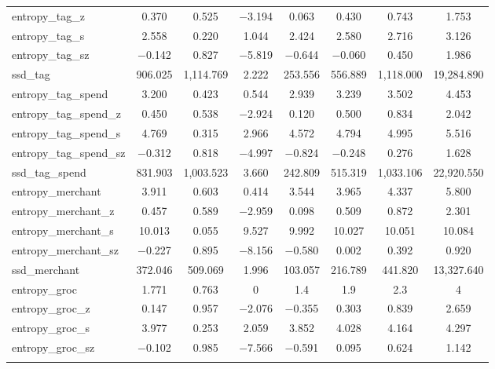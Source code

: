 \begin{table}[!htbp]
\begin{tabular}{@{\extracolsep{5pt}}lccccccc}
entropy\_tag\_z & 0.370 & 0.525 & $-$3.194 & 0.063 & 0.430 & 0.743 & 1.753 \\ 
entropy\_tag\_s & 2.558 & 0.220 & 1.044 & 2.424 & 2.580 & 2.716 & 3.126 \\ 
entropy\_tag\_sz & $-$0.142 & 0.827 & $-$5.819 & $-$0.644 & $-$0.060 & 0.450 & 1.986 \\ 
ssd\_tag & 906.025 & 1,114.769 & 2.222 & 253.556 & 556.889 & 1,118.000 & 19,284.890 \\ 
entropy\_tag\_spend & 3.200 & 0.423 & 0.544 & 2.939 & 3.239 & 3.502 & 4.453 \\ 
entropy\_tag\_spend\_z & 0.450 & 0.538 & $-$2.924 & 0.120 & 0.500 & 0.834 & 2.042 \\ 
entropy\_tag\_spend\_s & 4.769 & 0.315 & 2.966 & 4.572 & 4.794 & 4.995 & 5.516 \\ 
entropy\_tag\_spend\_sz & $-$0.312 & 0.818 & $-$4.997 & $-$0.824 & $-$0.248 & 0.276 & 1.628 \\ 
ssd\_tag\_spend & 831.903 & 1,003.523 & 3.660 & 242.809 & 515.319 & 1,033.106 & 22,920.550 \\ 
entropy\_merchant & 3.911 & 0.603 & 0.414 & 3.544 & 3.965 & 4.337 & 5.800 \\ 
entropy\_merchant\_z & 0.457 & 0.589 & $-$2.959 & 0.098 & 0.509 & 0.872 & 2.301 \\ 
entropy\_merchant\_s & 10.013 & 0.055 & 9.527 & 9.992 & 10.027 & 10.051 & 10.084 \\ 
entropy\_merchant\_sz & $-$0.227 & 0.895 & $-$8.156 & $-$0.580 & 0.002 & 0.392 & 0.920 \\ 
ssd\_merchant & 372.046 & 509.069 & 1.996 & 103.057 & 216.789 & 441.820 & 13,327.640 \\ 
entropy\_groc & 1.771 & 0.763 & 0 & 1.4 & 1.9 & 2.3 & 4 \\ 
entropy\_groc\_z & 0.147 & 0.957 & $-$2.076 & $-$0.355 & 0.303 & 0.839 & 2.659 \\ 
entropy\_groc\_s & 3.977 & 0.253 & 2.059 & 3.852 & 4.028 & 4.164 & 4.297 \\ 
entropy\_groc\_sz & $-$0.102 & 0.985 & $-$7.566 & $-$0.591 & 0.095 & 0.624 & 1.142 \\ 
\hline \\[-1.8ex] 
\end{tabular} 
\end{table} 
